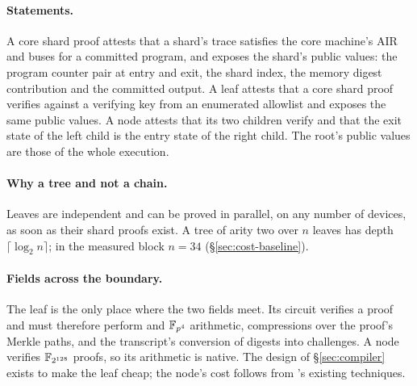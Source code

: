 \paragraph{Statements.} A core shard proof attests that a shard's trace satisfies the core machine's AIR and buses for a committed program, and exposes the shard's public values: the program counter pair at entry and exit, the shard index, the memory digest contribution and the committed output. A leaf attests that a core shard proof verifies against a verifying key from an enumerated allowlist and exposes the same public values. A node attests that its two children verify and that the exit state of the left child is the entry state of the right child. The root's public values are those of the whole execution.

\paragraph{Why a tree and not a chain.} Leaves are independent and can be proved in parallel, on any number of devices, as soon as their shard proofs exist. A tree of arity two over $n$ leaves has depth $\lceil \log_2 n \rceil$; in the measured block $n = 34$ (\S\ref{sec:cost-baseline}).

\paragraph{Fields across the boundary.} The leaf is the only place where the two fields meet. Its circuit verifies a \KB{} proof and must therefore perform \KB{} and $\mathbb{F}_{p^4}$ arithmetic, \Blake{} compressions over the proof's Merkle paths, and the transcript's conversion of \Blake{} digests into \KB{} challenges. A node verifies $\mathbb{F}_{2^{128}}$ proofs, so its arithmetic is native. The design of \S\ref{sec:compiler} exists to make the leaf cheap; the node's cost follows from \Flock{}'s existing techniques.
